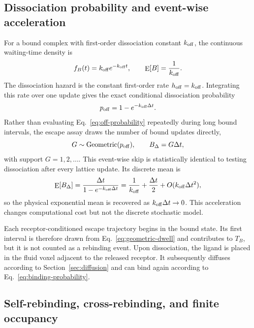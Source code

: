 \subsection{Dissociation probability and event-wise acceleration}

For a bound complex with first-order dissociation constant $k_{\mathrm{off}}$, the
continuous waiting-time density is
\begin{equation}
 f_B(t)=k_{\mathrm{off}} e^{-k_{\mathrm{off}} t},
 \qquad \mathop{\mathrm{E}}[B]=\frac{1}{k_{\mathrm{off}}}.
 \label{eq:exponential-dwell}
\end{equation}
The dissociation hazard is the constant first-order rate $h_{\mathrm{off}}=
k_{\mathrm{off}}$.  Integrating this rate over one update gives the exact conditional
dissociation probability
\begin{equation}
 p_{\mathrm{off}}=1-e^{-k_{\mathrm{off}}\Delta t}.
 \label{eq:off-probability}
\end{equation}
Rather than evaluating Eq.~\ref{eq:off-probability} repeatedly during long
bound intervals, the escape assay draws the number of bound updates directly,
\begin{equation}
 G\sim\operatorname{Geometric}(p_{\mathrm{off}}),\qquad B_{\Delta}=G\Delta t,
 \label{eq:geometric-dwell}
\end{equation}
with support $G=1,2,\ldots$.  This event-wise skip is statistically identical
to testing dissociation after every lattice update.  Its discrete mean is
\begin{equation}
 \mathop{\mathrm{E}}[B_{\Delta}]
 =\frac{\Delta t}{1-e^{-k_{\mathrm{off}}\Delta t}}
 =\frac{1}{k_{\mathrm{off}}}+\frac{\Delta t}{2}+O(k_{\mathrm{off}}\Delta t^2),
 \label{eq:discrete-dwell-mean}
\end{equation}
so the physical exponential mean is recovered as $k_{\mathrm{off}}\Delta t\rightarrow0$.
This acceleration changes computational cost but not the discrete stochastic
model.

Each receptor-conditioned escape trajectory begins in the bound state.  Its
first interval is therefore drawn from Eq.~\ref{eq:geometric-dwell} and
contributes to $T_B$, but it is not counted as a rebinding event.  Upon
dissociation, the ligand is placed in the fluid voxel adjacent to the released
receptor.  It subsequently diffuses according to Section~\ref{sec:diffusion}
and can bind again according to Eq.~\ref{eq:binding-probability}.

\subsection{Self-rebinding, cross-rebinding, and finite occupancy}

